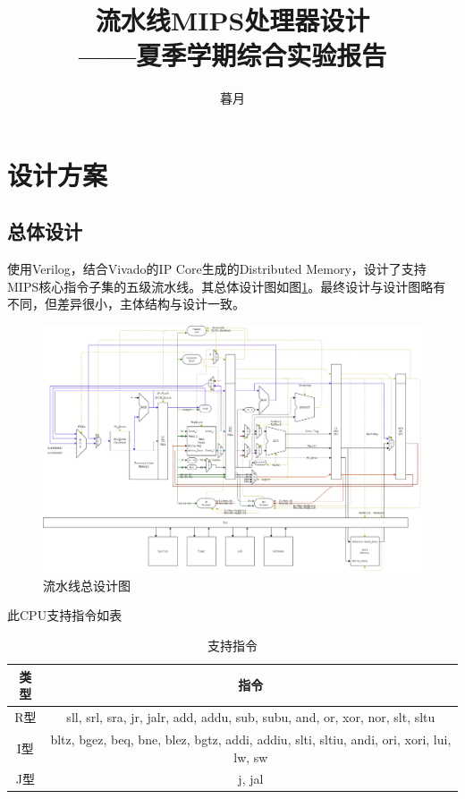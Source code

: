 \documentclass[a4paper]{article}
\begin{document}

\title{\textbf{流水线MIPS处理器设计}\\——夏季学期综合实验报告}
\author{暮月}
\date{}
\maketitle

\tableofcontents

\newpage

\section{设计方案}

\subsection{总体设计}

使用Verilog，结合Vivado的IP Core生成的Distributed Memory，设计了支持MIPS核心指令子集的五级流水线。其总体设计图如图\ref{fig:总设计}。最终设计与设计图略有不同，但差异很小，主体结构与设计一致。

\begin{figure}[ht]
    \centering
    \includegraphics[width=.8\textwidth]{../assets/design.png}
    \caption{流水线总设计图}
    \label{fig:总设计}
\end{figure}

此CPU支持指令如表

\begin{table}[htb]
    \centering
    \caption{支持指令}
    \begin{tabular}{cc}
        \toprule
        类型 & 指令                                                                                     \\
        \midrule
        R型  & sll, srl, sra, jr, jalr, add, addu, sub, subu, and, or, xor, nor, slt, sltu              \\
        I型  & bltz, bgez, beq, bne, blez, bgtz, addi, addiu, slti, sltiu, andi, ori, xori, lui, lw, sw \\
        J型  & j, jal                                                                                   \\
        \bottomrule
    \end{tabular}
\end{table}
\end{document}
